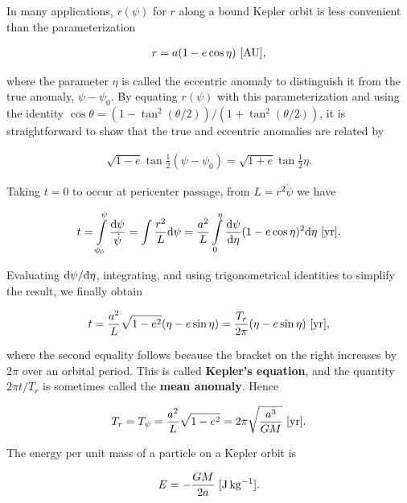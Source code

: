 \documentclass[a4paper,10pt]{article}
\begin{document}
{\noindent}In many applications, $r(\psi)$ for $r$ along a bound Kepler orbit is less convenient than the parameterization

\begin{align*}
    r = a(1-e\cos\eta) ~ [{\rm AU}],
\end{align*}

{\noindent}where the parameter $\eta$ is called the eccentric anomaly to distinguish it from the true anomaly, $\psi-\psi_0$. By equating $r(\psi)$ with this parameterization and using the identity $\cos\theta=(1−\tan^2(\theta/2))/(1+\tan^2(\theta/2))$, it is straightforward to show that the true and eccentric anomalies are related by

\begin{align*}
    \sqrt{1-e}\tan\frac{1}{2}(\psi-\psi_0) = \sqrt{1+e}\tan\frac{1}{2}\eta.
\end{align*}

{\noindent}Taking $t=0$ to occur at pericenter passage, from $L=r^2\dot{\psi}$ we have

\begin{align*}
    t = \int\limits_{\psi_0}^\psi \frac{{\rm d}\psi}{\dot{\psi}} = \int\frac{r^2}{L}{\rm d}\psi = \frac{a^2}{L}\int\limits_0^\eta \frac{{\rm d}\psi}{{\rm d}\eta}(1-e\cos\eta)^2{\rm d}\eta ~ [{\rm yr}].
\end{align*}

{\noindent}Evaluating ${\rm d}\psi/{\rm d}\eta$, integrating, and using trigonometrical identities to simplify the result, we finally obtain

\begin{align*}
    t = \frac{a^2}{L}\sqrt{1-e^2}(\eta-e\sin\eta) = \frac{T_r}{2\pi}(\eta-e\sin\eta) ~ [{\rm yr}],
\end{align*}

{\noindent}where the second equality follows because the bracket on the right increases by $2\pi$ over an orbital period. This is called \textbf{Kepler's equation}, and the quantity $2\pi t/T_r$ is sometimes called the \textbf{mean anomaly}. Hence

\begin{align*}
    T_r = T_\psi = \frac{a^2}{L}\sqrt{1-e^2} = 2\pi\sqrt{\frac{a^3}{GM}} ~ [{\rm yr}].
\end{align*}

{\noindent}The energy per unit mass of a particle on a Kepler orbit is

\begin{align*}
    E = -\frac{GM}{2a} ~ [{\rm J\,kg^{-1}}].
\end{align*}
\end{document}
